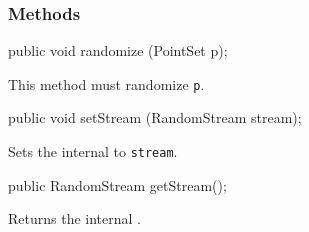 \subsubsection*{Methods}
\begin{code}

   public void randomize (PointSet p);
\end{code}
\begin{tabb}
   This method must randomize \texttt{p}.
\end{tabb}
\begin{htmlonly}
\end{htmlonly}
\begin{code}

   public void setStream (RandomStream stream);
\end{code}
\begin{tabb}
   Sets the internal
    to
   \texttt{stream}.
\end{tabb}
\begin{htmlonly}
\end{htmlonly}
\begin{code}

   public RandomStream getStream();
\end{code}
\begin{tabb}
   Returns the internal
   .
\end{tabb}
\begin{htmlonly}
\end{htmlonly}
\begin{code}\begin{hide}
}
\end{hide}\end{code}
